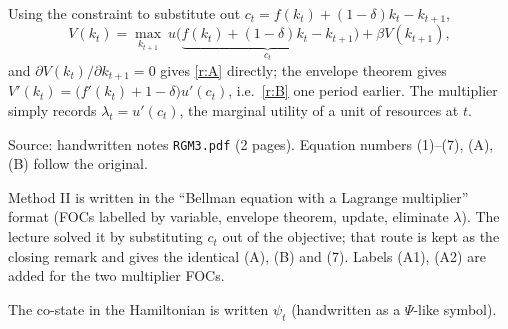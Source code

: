 \documentclass[11pt]{article}
\begin{document}
 Using the constraint to substitute out
$c_t=f(k_t)+(1-\delta)k_t-k_{t+1}$,
\[ V(k_t)=\max_{k_{t+1}}\ u\bigl(\underbrace{f(k_t)+(1-\delta)k_t-k_{t+1}}_{c_t}\bigr)+\beta V(k_{t+1}), \]
and $\partial V(k_t)/\partial k_{t+1}=0$ gives \eqref{r:A} directly; the envelope theorem
gives $V'(k_t)=\bigl(f'(k_t)+1-\delta\bigr)u'(c_t)$, i.e.\ \eqref{r:B} one period
earlier. The multiplier simply records $\lambda_t=u'(c_t)$, the marginal utility of a unit
of resources at $t$.


\begin{transcriptnotes}
  \item Source: handwritten notes \texttt{RGM3.pdf} (2 pages). Equation numbers
        (1)--(7), (A), (B) follow the original.
  \item Method II is written in the ``Bellman equation with a Lagrange multiplier''
        format (FOCs labelled by variable, envelope theorem, update, eliminate
        $\lambda$). The lecture solved it by substituting $c_t$ out of the objective; that
        route is kept as the closing remark and gives the identical (A), (B) and (7).
        Labels (A1), (A2) are added for the two multiplier FOCs.
  \item The co-state in the Hamiltonian is written $\psi_t$ (handwritten as a
        $\Psi$-like symbol).
\end{transcriptnotes}
\end{document}
